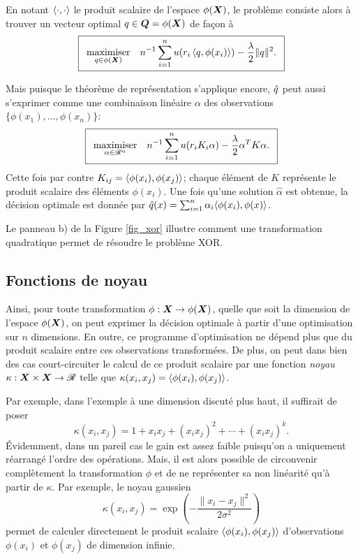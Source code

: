 En notant $\inp{\cdot,\cdot}$ le produit scalaire de l'espace $\phi(\X)$, le problème consiste alors
à trouver un vecteur optimal $q \in \Q = \phi(\X)$ de façon à
{\begin{equation}
    \boxed{
      \maximizeEquation[q\in\phi(\X)]{n^{-1}\sumi u(r_i\,\inp{q,\phi(x_i)}) - \frac{\lambda}{2}\|q\|^2.}}
  \end{equation}
  \vspace{-\baselineskip}}

Mais puisque le théorème de représentation s'applique encore, $\qh$ peut aussi s'exprimer
comme une combinaison linéaire $\alpha$ des observations $\{\phi(x_1) ,\ldots, \phi(x_n)\}$:
{\begin{equation}
\boxed{
  \maximizeEquation[\alpha \in \Re^n]{n^{-1}\sumi u(r_iK_i\alpha) - \frac{\lambda}{2}\alpha^TK\alpha.}}
\end{equation}
\vspace{-\baselineskip}}
Cette fois par contre $K_{ij} = \inp{\phi(x_i),\phi(x_j)}$; chaque élément de $K$ représente le
produit scalaire des éléments $\phi(x_i)$. Une fois qu'une solution $\hat\alpha$ est obtenue, la
décision optimale est donnée par $\qh(x) = \sumi \alpha_i\langle\phi(x_i),\phi(x)\rangle$. 

Le panneau b) de la Figure \ref{fig_xor} illustre comment une transformation quadratique
permet de résoudre le problème XOR.


\subsection{Fonctions de noyau}

Ainsi, pour toute transformation $\phi:\X\to\phi(\X)$, quelle que soit la dimension de l'espace
$\phi(\X)$, on peut exprimer la décision optimale à partir d'une optimisation sur $n$
dimensions. En outre, ce programme d'optimisation ne dépend plus que du produit scalaire
entre ces observations transformées. De plus, on peut dans bien des cas court-circuiter le
calcul de ce produit scalaire par une fonction \textit{noyau} $\kappa:\X\times\X \to \Re$ telle que
$\kappa(x_i,x_j) = \inp{\phi(x_i),\phi(x_j)}$.

Par exemple, dans l'exemple à une dimension discuté plus haut, il suffirait de poser
\begin{equation}
  \kappa(x_i,x_j) = 1 + x_ix_j + (x_ix_j)^2 + \cdots + (x_ix_j)^k.
\end{equation}
Évidemment, dans un pareil cas le gain est assez faible puisqu'on a uniquement réarrangé
l'ordre des opérations. Mais, il est alors possible de circonvenir complètement la
transformation $\phi$ et de ne représenter sa non linéarité qu'à partir de $\kappa$. Par exemple,
le noyau gaussien
\begin{equation}
  \kappa(x_i,x_j) = \exp\left(-\frac{\|x_i-x_j\|^2}{2\sigma^2}\right)
\end{equation}
permet de calculer directement le produit scalaire $\inp{\phi(x_i),\phi(x_j)}$ d'observations
$\phi(x_i)$ et $\phi(x_j)$ de dimension infinie.

